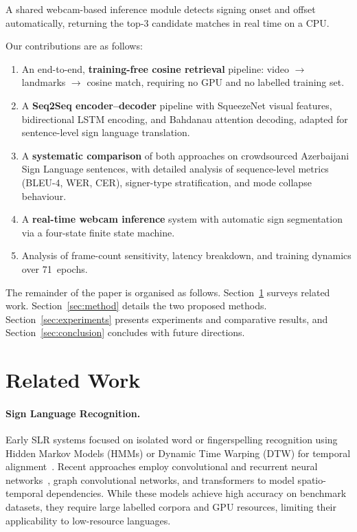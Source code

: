 \documentclass[runningheads]{llncs}
\begin{document}
A shared webcam-based inference module detects signing onset and offset
automatically, returning the top-3 candidate matches in real time on a
CPU.

Our contributions are as follows:
\begin{enumerate}
    \item An end-to-end, \textbf{training-free cosine retrieval}
          pipeline: video $\rightarrow$ landmarks $\rightarrow$ cosine
          match, requiring no GPU and no labelled training set.
    \item A \textbf{Seq2Seq encoder--decoder} pipeline with SqueezeNet
          visual features, bidirectional LSTM encoding, and Bahdanau
          attention decoding, adapted for sentence-level sign language
          translation.
    \item A \textbf{systematic comparison} of both approaches on
          crowdsourced Azerbaijani Sign Language sentences, with
          detailed analysis of sequence-level metrics (BLEU-4, WER,
          CER), signer-type stratification, and mode collapse
          behaviour.
    \item A \textbf{real-time webcam inference} system with automatic
          sign segmentation via a four-state finite state machine.
    \item Analysis of frame-count sensitivity, latency breakdown, and
          training dynamics over 71~epochs.
\end{enumerate}

The remainder of the paper is organised as follows.
Section~\ref{sec:related} surveys related work.
Section~\ref{sec:method} details the two proposed methods.
Section~\ref{sec:experiments} presents experiments and comparative
results, and Section~\ref{sec:conclusion} concludes with future
directions.

\section{Related Work}\label{sec:related}

\paragraph{Sign Language Recognition.}
Early SLR systems focused on isolated word or fingerspelling recognition
using Hidden Markov Models (HMMs) or Dynamic Time Warping (DTW) for
temporal alignment~\cite{fang2013bayesian}.
Recent approaches employ convolutional and recurrent neural
networks~\cite{liu2024skeleton}, graph convolutional
networks, and transformers to model spatio-temporal
dependencies.
While these models achieve high accuracy on benchmark datasets, they
require large labelled corpora and GPU resources, limiting their
applicability to low-resource languages.
\end{document}
